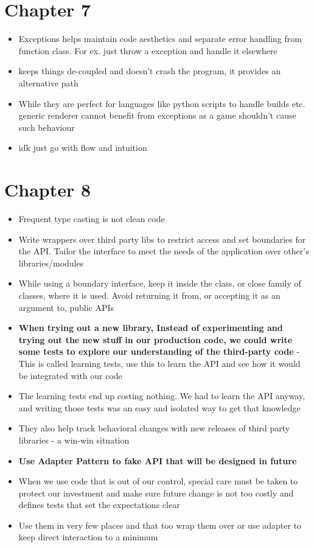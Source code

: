 \documentclass[14pt]{article}
\begin{document}
\section*{Chapter 7}
\begin{itemize}
	
	\item Exceptions helps maintain code aesthetics and separate error handling from function class. For ex. just throw a exception and handle it elsewhere
	\item keeps things de-coupled and doesn't crash the program, it provides an alternative path
	\item While they are perfect for languages like python scripts to handle builds etc. generic renderer cannot benefit from exceptions as a game shouldn't cause such 
behaviour
	\item idk just go with flow and intuition
	
\end{itemize}
\section*{Chapter 8}
\begin{itemize}

	\item Frequent type casting is not clean code
	\item Write wrappers over third party libs to restrict access and set boundaries for the API. Tailor the interface to meet the needs of the application over other's libraries/modules
	\item While using a boundary interface, keep it inside the class, or close family of classes, where it is used. Avoid returning it from, or accepting it as an argument to, public APIs
	\item \textbf{When trying out a new library, Instead of experimenting and trying out the new stuff in our production code, we could write some tests to explore our understanding of the third-party code} - This is called learning tests, use this to learn the API and see how it would be integrated with our code
	\item The learning tests end up costing nothing. We had to learn the API anyway, and writing those tests was an easy and isolated way to get that knowledge
	\item They also help track behavioral changes with new releases of third party libraries - a win-win situation
	\item \textbf{Use Adapter Pattern to fake API that will be designed in future}
	\item When we use code that is out of our control, special care must be taken to protect our investment and make sure future change is not too costly and defines tests that set the expectations clear
	\item Use them in very few places and that too wrap them over or use adapter to keep direct interaction to a minimum
	
\end{itemize}
\end{document}
